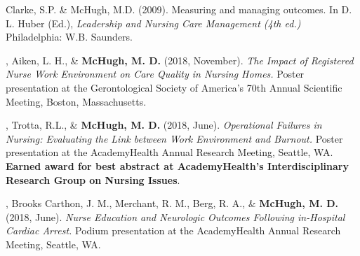 \documentclass[10pt,]{article}
\begin{document}
{{{{{{{{{{{{{{{

\begin{hangparas}{.25in}{1}

\*Clarke, S.P. \& McHugh, M.D. (2009). Measuring and managing outcomes. In D. L. Huber (Ed.), {\textit {Leadership and Nursing Care Management (4th ed.)}} Philadelphia: W.B. Saunders.

\end{hangparas}

\vspace{4mm}


\begin{hangparas}{.25in}{1}

, Aiken, L. H., \& {\textbf {McHugh, M. D.}} (2018, November). {\textit {The Impact of Registered Nurse Work Environment on Care Quality in Nursing Homes.}} {\small{Poster presentation at the Gerontological Society of America's 70th Annual Scientific Meeting, Boston, Massachusetts.}}

\end{hangparas}

\vspace{4mm}

\begin{hangparas}{.25in}{1}

, Trotta, R.L., \& {\textbf {McHugh, M. D.}} (2018, June). {\textit {Operational Failures in Nursing: Evaluating the Link between Work Environment and Burnout.}} {\small{Poster presentation at the AcademyHealth Annual Research Meeting, Seattle, WA. {\textbf {Earned award for best abstract at AcademyHealth's Interdisciplinary Research Group on Nursing Issues}}.}}

\end{hangparas}

\vspace{4mm}

\begin{hangparas}{.25in}{1}

, Brooks Carthon, J. M., Merchant, R. M., Berg, R. A., \& {\textbf {McHugh, M. D.}} (2018, June). {\textit {Nurse Education and Neurologic Outcomes Following in-Hospital Cardiac Arrest.}} {\small{Podium presentation at the AcademyHealth Annual Research Meeting, Seattle, WA.}}


\end{hangparas}}}}}}}}}}}}}}}}
\end{document}
